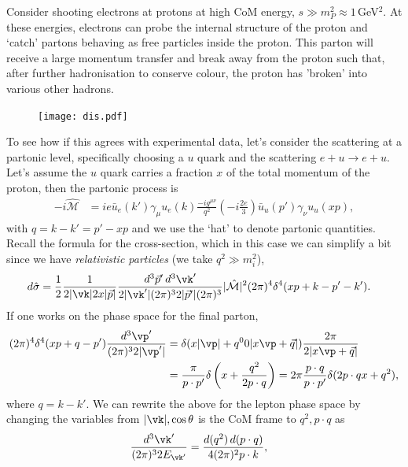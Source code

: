 \documentclass[relqm.tex]{subfiles}
\begin{document}
Consider shooting electrons at protons at high CoM energy, $s\gg m_P^2\approx 1\,$GeV$^2$.
At these energies, electrons can probe the internal structure of the proton and `catch' partons behaving as free particles inside the proton. 
This parton will receive a large momentum transfer and break away from the proton such that, after further hadronisation to conserve colour, the proton has 'broken' into various other hadrons. 
\begin{figure}[H]
    \centering
    \texttt{[image: dis.pdf]}
\end{figure}
To see how if this agrees with experimental data, let's consider the scattering at a partonic level, specifically choosing a $u$ quark and the scattering $e+u\to e+u$.
Let's assume the $u$ quark carries a fraction $x$ of the total momentum of the proton, then the partonic process is
\begin{align}
    -i\hat{\mathcal{M}} &= ie\bar{u}_e(k')\gamma_\mu u_e(k)\frac{-ig^{\mu\nu}}{q^2}\left(-i\frac{2e}{3}\right)\bar{u}_u(p')\gamma_\nu u_u(xp),
\end{align}
with $q=k-k'=p'-xp$ and we use the `hat' to denote partonic quantities. 
Recall the formula for the cross-section, which in this case we can simplify a bit since we have \emph{relativistic particles} (we take $q^2\gg m_i^2$),
\begin{align}
    d\hat{\sigma} &= \frac12 \frac{1}{2|\vk|2x|\vec{p}|} \frac{d^3\vec{p}'\,d^3\vk'}{2|\vk'|(2\pi)^32|\vec{p}'|(2\pi)^3}|\hat{\mathcal{M}}|^2 (2\pi)^4 \delta^4(xp+k-p'-k').
\end{align}
If one works on the phase space for the final parton, 
\begin{align}
    \begin{split}
        (2\pi)^4\delta^4(xp+q-p')\frac{d^3\vp'}{(2\pi)^32|\vp'|} &= \delta(x|\vp|+q^00|x\vp+\vec{q}|)\frac{2\pi}{2|x\vp+\vec{q}|} \\
                                                                 &= \frac{\pi}{p\cdot p'}\delta\left(x+\frac{q^2}{2p\cdot q}\right) = 2\pi\frac{p\cdot q}{p\cdot p'}\delta(2p\cdot qx + q^2),
    \end{split}
\end{align}
where $q=k-k'$.
We can rewrite the above for the lepton phase space by changing the variables from $|\vk|,\cos\theta$ is the CoM frame to $q^2,p\cdot q$ as
\begin{align}
    \frac{d^3\vk'}{(2\pi)^32E_{\vk'}} &= \frac{d(q^2)\,d(p\cdot q)}{4(2\pi)^2p\cdot k},
\end{align}
\end{document}
